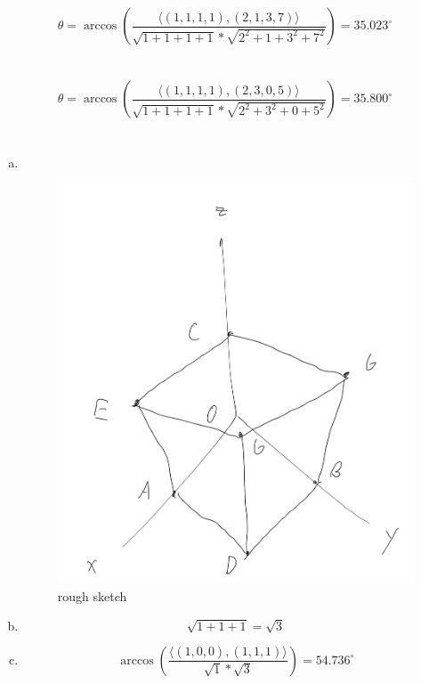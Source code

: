 \documentclass[12pt]{article}
\begin{document}
\section{}
\[ \theta = \arccos\left(\dfrac{\langle (1,1,1,1), (2,1,3,7)\rangle}{\sqrt{1 + 1 + 1 + 1}*\sqrt{2^2 + 1 + 3^2 + 7^2}}\right) = 35.023^{\circ} \]
\newpage

\section{}
\[ \theta = \arccos\left(\dfrac{\langle (1,1,1,1), (2,3,0,5)\rangle}{\sqrt{1 + 1 + 1 + 1}*\sqrt{2^2+3^2+0+5^2}}\right) = 35.800^{\circ} \]
\newpage

\section{}
\begin{enumerate}[(a)]
	\item \,
	\begin{figure}[H]
		\centering
		\includegraphics[width=\textwidth]{images/cube.png}
		\caption{rough sketch}
		\label{fig:a:sketch}
	\end{figure}

	\item \[ \sqrt{1+1+1} = \sqrt{3} \]
	
	\item \[ \arccos\left(\dfrac{\langle (1,0,0), (1,1,1)\rangle}{\sqrt{1} * \sqrt{3}}\right) = 54.736^{\circ}\]
\end{enumerate}
\newpage
\end{document}
